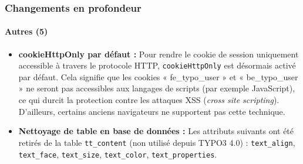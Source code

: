 \begin{frame}[fragile]
	\frametitle{Changements en profondeur}
	\framesubtitle{Autres (5)}

	\begin{itemize}

		\item \textbf{cookieHttpOnly par défaut :}\newline
			\small
				Pour rendre le cookie de session uniquement accessible à travers le protocole HTTP, \texttt{cookieHttpOnly} est désormais activé par défaut.\newline
				Cela signifie que les cookies « fe\_typo\_user » et « be\_typo\_user » ne seront pas accessibles aux langages de scripts (par exemple JavaScript), ce qui durcit la protection contre les attaques XSS (\textit{cross site scripting}). D'ailleurs, certains anciens navigateurs ne supportent pas cette technique.
			\normalsize

		\item \textbf{Nettoyage de table en base de données :}\newline
			\small
				Les attributs suivants ont été retirés de la table \texttt{tt\_content} (non utilisé depuis TYPO3 4.0) :
				\texttt{text\_align}, \texttt{text\_face}, \texttt{text\_size}, \texttt{text\_color}, \texttt{text\_properties}.
			\normalsize

	\end{itemize}
	
\end{frame}


